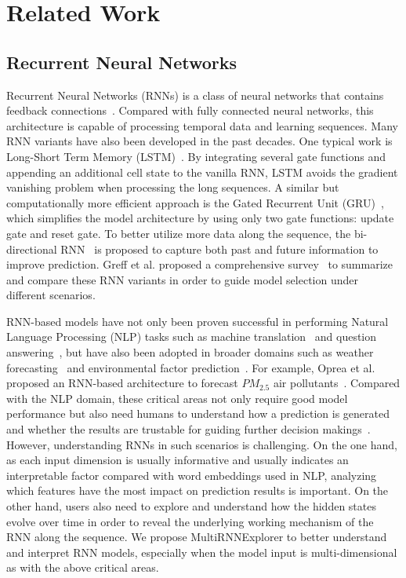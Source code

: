 \section{Related Work}
\label{sec:rel}

\subsection{Recurrent Neural Networks}
\label{sec:rnn}
Recurrent Neural Networks (RNNs) is a class of neural networks that contains feedback connections~\cite{hochreiter1991untersuchungen}.
Compared with fully connected neural networks, this architecture is capable of processing temporal data and learning sequences.
Many RNN variants have also been developed in the past decades.
One typical work is Long-Short Term Memory (LSTM)~\cite{hochreiter1997long}.
By integrating several gate functions and appending an additional cell state to the vanilla RNN, LSTM avoids the gradient vanishing problem when processing the long sequences.
A similar but computationally more efficient approach is the Gated Recurrent Unit (GRU)~\cite{cho2014learning}, which simplifies the model architecture by using only two gate functions: update gate and reset gate.
To better utilize more data along the sequence, the bi-directional RNN~\cite{schuster1997bidirectional} is proposed to capture both past and future information to improve prediction.
Greff et al. proposed a comprehensive survey~\cite{greff2017lstm} to summarize and compare these RNN variants in order to guide model selection under different scenarios.

RNN-based models have not only been proven successful in performing Natural Language Processing (NLP) tasks such as machine translation~\cite{sutskever2014sequence} and question answering~\cite{hermann2015teaching}, but have also been adopted in broader domains such as weather forecasting~\cite{xingjian2015convolutional} and environmental factor prediction~\cite{chen2018applications}.
For example, Oprea et al. proposed an RNN-based architecture to forecast $PM_{2.5}$ air pollutants~\cite{oprea2016neural}.
Compared with the NLP domain, these critical areas not only require good model performance but also need humans to understand how a prediction is generated and whether the results are trustable for guiding further decision makings~\cite{lipton2017doctor}.
However, understanding RNNs in such scenarios is challenging.
On the one hand, as each input dimension is usually informative and usually indicates an interpretable factor compared with word embeddings used in NLP, analyzing which features have the most impact on prediction results is important.
On the other hand, users also need to explore and understand how the hidden states evolve over time in order to reveal the underlying working mechanism of the RNN along the sequence.
We propose MultiRNNExplorer to better understand and interpret RNN models, especially when the model input is multi-dimensional as with the above critical areas.

